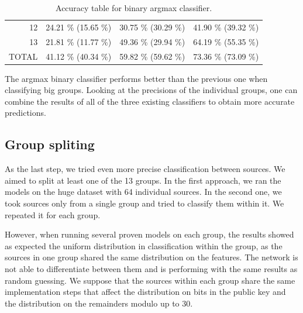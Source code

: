 \begin{table}[h]
\begin{tabular}{| r | c | c | c |}
12    & 24.21 \% {\color[HTML]{9B9B9B} (15.65 \%)} & 30.75 \% {\color[HTML]{9B9B9B} (30.29 \%)} & 41.90 \% {\color[HTML]{9B9B9B} (39.32 \%)} \\

13    & 21.81 \% {\color[HTML]{9B9B9B} (11.77 \%)} & 49.36 \% {\color[HTML]{9B9B9B} (29.94 \%)} & 64.19 \% {\color[HTML]{9B9B9B} (55.35 \%)} \\

\hline
TOTAL & 41.12 \% {\color[HTML]{9B9B9B} (40.34 \%)} & 59.82 \% {\color[HTML]{9B9B9B} (59.62 \%)} & 73.36 \% {\color[HTML]{9B9B9B} (73.09 \%)} \\
\hline                       
\end{tabular}
\caption{Accuracy table for binary argmax classifier.}
\label{table-binary-voter}
\end{table}

The argmax binary classifier performs better than the previous one when classifying big groups. Looking at the precisions of the individual groups, one can combine the results of all of the three existing classifiers to obtain more accurate predictions.

\subsection*{Group spliting}

As the last step, we tried even more precise classification between sources. We aimed to split at least one of the 13 groups. In the first approach, we ran the models on the huge dataset with 64 individual sources. In the second one, we took sources only from a single group and tried to classify them within it. We repeated it for each group.

However, when running several proven models on each group, the results showed as expected the uniform distribution in classification within the group, as the sources in one group shared the same distribution on the features. The network is not able to differentiate between them and is performing with the same results as random guessing. We suppose that the sources within each group share the same implementation steps that affect the distribution on bits in the public key and the distribution on the remainders modulo up to 30.

